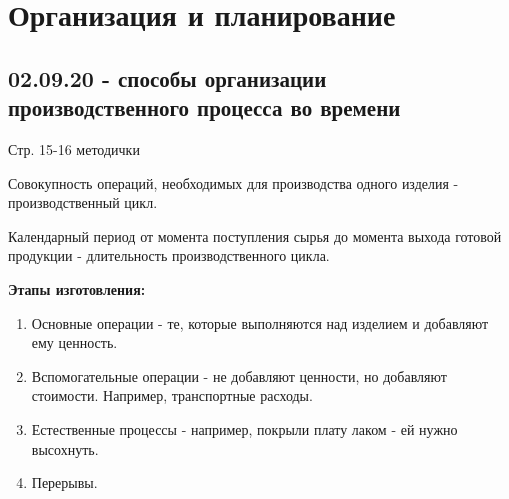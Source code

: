 


\section{Организация и планирование}

\subsection{02.09.20 - способы организации производственного процесса во времени}

\begin{figure}[h]
\end{figure}

\begin{remark}
	Стр. 15-16 методички
\end{remark}

Совокупность операций, необходимых для производства одного изделия - производственный цикл.

Календарный период от момента поступления сырья до момента выхода готовой продукции - длительность производственного цикла.

\noindent\textbf{Этапы изготовления: }

\begin{enumerate}
	\item Основные операции - те, которые выполняются над изделием и добавляют ему ценность. 
	\item Вспомогательные операции - не добавляют ценности, но добавляют стоимости. Например, транспортные расходы.
	\item Естественные процессы - например, покрыли плату лаком - ей нужно высохнуть.
	\item Перерывы.
\end{enumerate}

